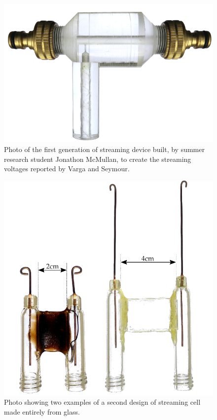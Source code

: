     \begin{figure}
      \centering
      \includegraphics[scale=0.9]{content/pt1/01-PowerHarvesting/graphics/StreamingCell_v0}
      \caption{\label{fig:first_cell}Photo of the first generation of streaming device built, by summer research student Jonathon McMullan, to create the streaming voltages reported by Varga and Seymour.}
    \end{figure}
    \begin{figure}
      \centering
      \includegraphics[scale=0.7]{content/pt1/01-PowerHarvesting/graphics/StreamingCells_v1}
      \caption{\label{fig:first_cells}Photo showing two examples of a second design of streaming cell made entirely from glass.}
    \end{figure}

